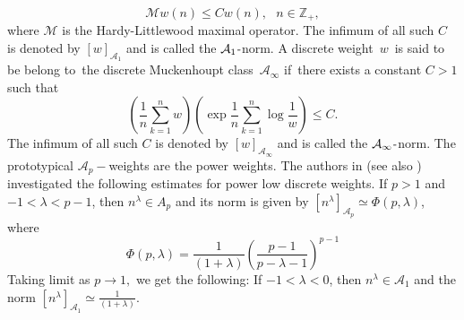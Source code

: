 \documentclass[a4paper]{amsart}
\theoremstyle{plain}
\numberwithin{equation}{section}
\begin{document}
\begin{equation*}
\mathcal{M}w(n)\leq Cw(n),\text{ \ \ \ }n\in \mathbb{Z}_{+},
\end{equation*}%
where $\mathcal{M}$ is the Hardy-Littlewood maximal operator. The infimum of
all such $C$ is denoted by $[w]_{\mathcal{A}_{1}}$ and is called the $%
\mathcal{A}_{1}\emph{-}$norm. A discrete weight\ $w$\ is said to be belong
to\ the discrete Muckenhoupt class\ $\mathcal{A}_{\infty }$ if\ there exists
a constant $C>1$ such that%
\begin{equation*}
\left( \frac{1}{n}\sum\limits_{k=1}^{n}w\right) \left( \exp \frac{1}{n}%
\sum\limits_{k=1}^{n}\log \frac{1}{w}\right) \leq C.
\end{equation*}%
The infimum of all such $C$ is denoted by $[w]_{\mathcal{A}_{\infty }}$ and
is called the $\mathcal{A}_{\infty }\emph{-}$norm. The prototypical $%
\mathcal{A}_{p}-$weights are the power weights. The authors in \cite{Saker
et al} (see also \cite{Saker2023}) investigated the following estimates for
power low discrete weights. If $p>1$ and $-1<\lambda <p-1$, then $n^{\lambda
}\in A_{p}$ and its norm is given by $\left[ n^{\lambda }\right] _{\mathcal{A%
}_{p}}\simeq \Phi (p,\lambda )$, where 
\begin{equation}
\Phi (p,\lambda )=\frac{1}{(1+\lambda )}\left( \frac{p-1}{p-\lambda -1}%
\right) ^{p-1}  \label{a1}
\end{equation}%
Taking limit as $p\rightarrow 1,$ we get the following: If $-1<\lambda <0$,
then $n^{\lambda }\in \mathcal{A}_{1}$ and the norm $\left[ n^{\lambda }%
\right] _{\mathcal{A}_{1}}\simeq \frac{1}{(1+\lambda )}$.
\end{document}
